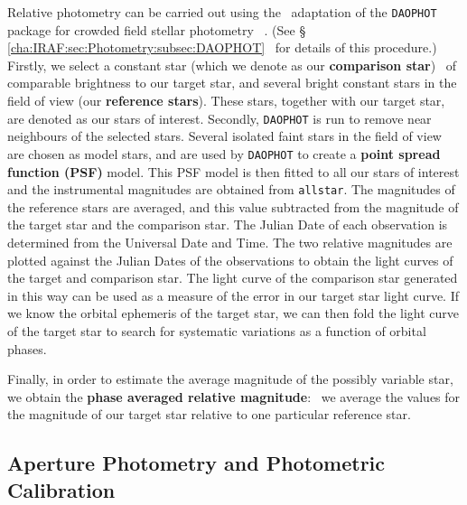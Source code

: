 Relative photometry can be carried out using the \iraf\ adaptation of the \texttt{DAOPHOT} package for crowded field stellar photometry%
\ \cite{Stetson:1987}. %
(See \S~%
\vref{cha:IRAF:sec:Photometry:subsec:DAOPHOT}%
\ for details of this procedure.) %
Firstly, we select a constant star (which we denote as our \textbf{comparison star})\label{cha:InfraredDataReductionTechniques:sec:Photometry:subsec:RelativePhotometry:topic:comparison}%
\ of comparable brightness to our target star, and several bright constant stars in the field of view (our \textbf{reference stars}). These stars, together with our target star, are denoted as our stars of
interest. Secondly, \texttt{DAOPHOT} is run to remove near neighbours of the selected
stars. Several isolated faint stars in the field of view are chosen
as model stars, and are used by \texttt{DAOPHOT} to create a
\textbf{point spread function (PSF)} model.
This PSF model is then fitted to all our stars of interest and the instrumental magnitudes are obtained from \texttt{allstar}. The magnitudes of the reference stars are averaged, and this value
subtracted from the magnitude of the target star and the comparison star.  The
Julian Date of each observation is determined from the Universal Date
and Time. The two relative magnitudes are plotted against the Julian Dates of
the observations to obtain the light curves of the target and
comparison star. The light curve of the comparison star generated in this way can be used as a measure of the error in our target star light curve. If we know the orbital ephemeris of the target star, we can then fold the light curve of the target star to search for systematic variations as a function of orbital phases. %

\vspace{\myparskip}

Finally, in order to estimate the average magnitude of the possibly
variable star, we obtain the \textbf{phase averaged relative
magnitude}:\label{cha:InfraredDataReductionTechniques:sec:Photometry:subsec:RelativePhotometry:topic:parm}%
\ we average the values for the magnitude of our target star
relative to one particular reference star.


\subsection{Aperture Photometry and Photometric Calibration}\label{cha:InfraredDataReductionTechniques:sec:Photometry:subsec:AperturePhotometry}


